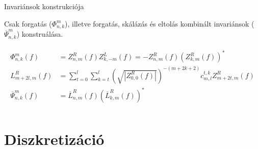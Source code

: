 \documentclass{beamer}
\begin{document}
\begin{frame}{Invariánsok konstrukciója}
    \bigskip

    Csak forgatás ($\Phi_{n,k}^m$), illetve forgatás, skálázás és eltolás kombinált invariánsok ($\overline{\Psi}_{n,k}^m$) konstruálása.

    \begin{gather*}
    \begin{split}
        \Phi_{n,k}^m(f) &= Z_{n,m}^R(f)Z_{k,-m}^L(f) = -Z_{n,m}^R(f)(Z_{k,m}^R(f))^*\\    
        L_{m + 2l,m}^R(f) &= \sum_{t=0}^l\sum_{k=t}^l\left(\sqrt{|Z_{0,0}^R(f)|}\right)^{-(m+2k+2)}c_{m,l}^{t,k}Z_{m+2t,m}^R(f) \\
        \overline{\Psi}_{n,k}^m(f) &= \overline{L}_{n,m}^R(f)(\overline{L}_{k,m}^R(f))^* \\
    \end{split}
    \end{gather*}
\end{frame}

\section{Diszkretizáció}
\end{document}
